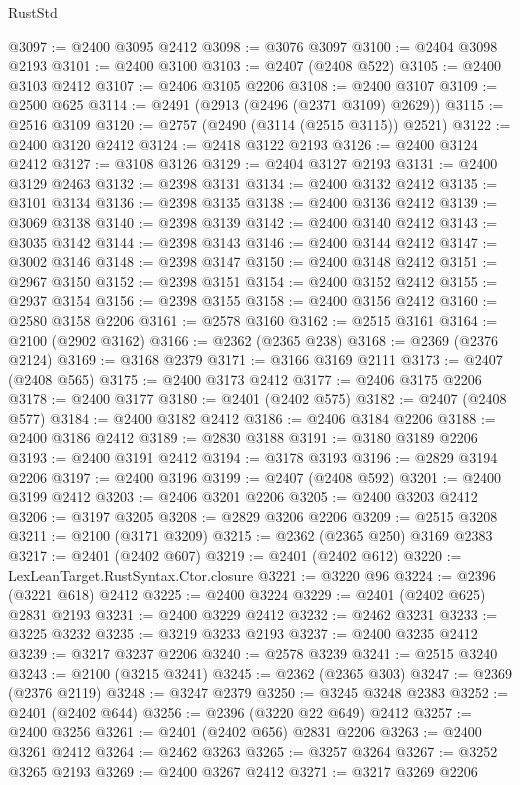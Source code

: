 \begin{lexlean}{RustStd}
\begin{coremodule}
@3097 := @2400 @3095 @2412
@3098 := @3076 @3097
@3100 := @2404 @3098 @2193
@3101 := @2400 @3100
@3103 := @2407 (@2408 @522)
@3105 := @2400 @3103 @2412
@3107 := @2406 @3105 @2206
@3108 := @2400 @3107
@3109 := @2500 @625
@3114 := @2491 (@2913 (@2496 (@2371 @3109) @2629))
@3115 := @2516 @3109
@3120 := @2757 (@2490 (@3114 (@2515 @3115)) @2521)
@3122 := @2400 @3120 @2412
@3124 := @2418 @3122 @2193
@3126 := @2400 @3124 @2412
@3127 := @3108 @3126
@3129 := @2404 @3127 @2193
@3131 := @2400 @3129 @2463
@3132 := @2398 @3131
@3134 := @2400 @3132 @2412
@3135 := @3101 @3134
@3136 := @2398 @3135
@3138 := @2400 @3136 @2412
@3139 := @3069 @3138
@3140 := @2398 @3139
@3142 := @2400 @3140 @2412
@3143 := @3035 @3142
@3144 := @2398 @3143
@3146 := @2400 @3144 @2412
@3147 := @3002 @3146
@3148 := @2398 @3147
@3150 := @2400 @3148 @2412
@3151 := @2967 @3150
@3152 := @2398 @3151
@3154 := @2400 @3152 @2412
@3155 := @2937 @3154
@3156 := @2398 @3155
@3158 := @2400 @3156 @2412
@3160 := @2580 @3158 @2206
@3161 := @2578 @3160
@3162 := @2515 @3161
@3164 := @2100 (@2902 @3162)
@3166 := @2362 (@2365 @238)
@3168 := @2369 (@2376 @2124)
@3169 := @3168 @2379
@3171 := @3166 @3169 @2111
@3173 := @2407 (@2408 @565)
@3175 := @2400 @3173 @2412
@3177 := @2406 @3175 @2206
@3178 := @2400 @3177
@3180 := @2401 (@2402 @575)
@3182 := @2407 (@2408 @577)
@3184 := @2400 @3182 @2412
@3186 := @2406 @3184 @2206
@3188 := @2400 @3186 @2412
@3189 := @2830 @3188
@3191 := @3180 @3189 @2206
@3193 := @2400 @3191 @2412
@3194 := @3178 @3193
@3196 := @2829 @3194 @2206
@3197 := @2400 @3196
@3199 := @2407 (@2408 @592)
@3201 := @2400 @3199 @2412
@3203 := @2406 @3201 @2206
@3205 := @2400 @3203 @2412
@3206 := @3197 @3205
@3208 := @2829 @3206 @2206
@3209 := @2515 @3208
@3211 := @2100 (@3171 @3209)
@3215 := @2362 (@2365 @250) @3169 @2383
@3217 := @2401 (@2402 @607)
@3219 := @2401 (@2402 @612)
@3220 := LexLeanTarget.RustSyntax.Ctor.closure
@3221 := @3220 @96
@3224 := @2396 (@3221 @618) @2412
@3225 := @2400 @3224
@3229 := @2401 (@2402 @625) @2831 @2193
@3231 := @2400 @3229 @2412
@3232 := @2462 @3231
@3233 := @3225 @3232
@3235 := @3219 @3233 @2193
@3237 := @2400 @3235 @2412
@3239 := @3217 @3237 @2206
@3240 := @2578 @3239
@3241 := @2515 @3240
@3243 := @2100 (@3215 @3241)
@3245 := @2362 (@2365 @303)
@3247 := @2369 (@2376 @2119)
@3248 := @3247 @2379
@3250 := @3245 @3248 @2383
@3252 := @2401 (@2402 @644)
@3256 := @2396 (@3220 @22 @649) @2412
@3257 := @2400 @3256
@3261 := @2401 (@2402 @656) @2831 @2206
@3263 := @2400 @3261 @2412
@3264 := @2462 @3263
@3265 := @3257 @3264
@3267 := @3252 @3265 @2193
@3269 := @2400 @3267 @2412
@3271 := @3217 @3269 @2206

\end{coremodule}
\end{lexlean}
